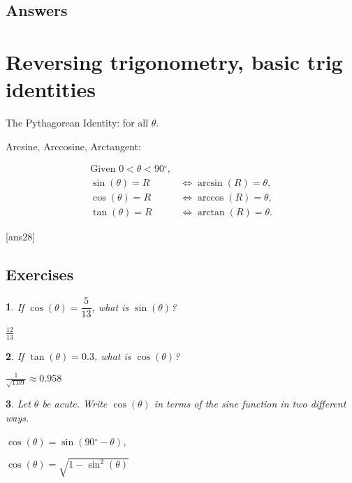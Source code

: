 \documentclass{amsbook}
\newtheorem{exc}{}
\newenvironment{ex}{\begin{exc}\normalfont}{\end{exc}}
\numberwithin{section}{chapter}
\numberwithin{equation}{chapter}
\newcommand{\dg}{{^\circ}}
\begin{document}
\subsection*{Answers \nopunct} \hfill
\begin{multicols}{2}
	
\end{multicols}

\newpage
\section{Reversing trigonometry, basic trig identities}

The Pythagorean Identity:  for all $\theta$.

\bigskip
Arcsine, Arccosine, Arctangent:

\begin{align*}
\text{Given } 0 < \theta < 90\dg,\\
\sin(\theta) = R & \iff \arcsin(R) = \theta,\\
\cos(\theta) = R & \iff \arccos(R) = \theta,\\
\tan(\theta) = R & \iff \arctan(R) = \theta.
\end{align*}


[ans28]
\subsection*{Exercises \nopunct} \hfill
\begin{ex} \label{sincos}
	If $\cos(\theta) = \dfrac{5}{13}$, what is $\sin(\theta)$?
	\begin{sol}
		$\frac{12}{13}$
	\end{sol}
\end{ex}
\begin{ex} \label{sincos}
	If $\tan(\theta) = 0.3$, what is $\cos(\theta)$?
	\begin{sol}
		$\frac{1}{\sqrt{1.09}} \approx 0.958$
	\end{sol}
\end{ex}

\begin{ex} \label{sincos2}
	Let $\theta$ be acute. Write $\cos(\theta)$ in terms of the sine function in two different ways.
	\begin{sol}
		$\cos(\theta) = \sin(90\dg-\theta)$,
		
		 $\cos(\theta) = \sqrt{1-\sin^2(\theta)}$
	\end{sol}
\end{ex}
\end{document}
